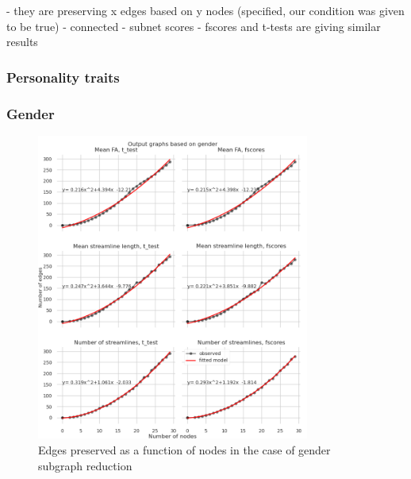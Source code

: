 \documentclass[msthesis.tex]{subfiles}
\begin{document}
- they are preserving x edges based on y nodes (specified, our condition was given to be true)
- connected
- subnet scores
- fscores and t-tests are giving similar results
\subsubsection{Personality traits}
\subsubsection{Gender}
\begin{figure}
    \centering
    \includegraphics[width=0.8\textwidth]{images/Gender_nodes_preserved.png}
    \caption{Edges preserved as a function of nodes in the case of gender subgraph reduction}
    \label{fig:my_label}
\end{figure}
\end{document}
